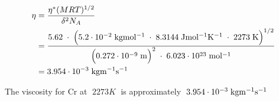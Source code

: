 \documentclass[11pt]{article}
\begin{document}
    \begin{align}
\eta &= \frac{\eta^* (MRT)^{1/2}}{\delta^2N_A} \\
&= \frac{5.62 \; \cdot \; \Big( 5.2 \cdot 10^{-2} \; \mathrm{kgmol^{-1}} \; \cdot \; 8.3144 \; \mathrm{Jmol^{-1}K^{-1}} \; \cdot \; 2273 \; \mathrm{K} \Big)^{1/2}}{\Big(0.272 \cdot 10^{-9} \; \mathrm{m} \Big)^2 \; \cdot \; 6.023 \cdot 10^{23} \; \mathrm{mol^{-1}}} \nonumber \\
&= 3.954 \cdot 10^{-3} \; \mathrm{kgm^{-1}s^{-1}} \nonumber
\end{align}

The viscosity for Cr at \(\;2273 K\;\) is approximately
\(\;3.954 \cdot 10^{-3} \; \mathrm{kgm^{-1}s^{-1}}\;\)


    
    


    
    
\end{document}
